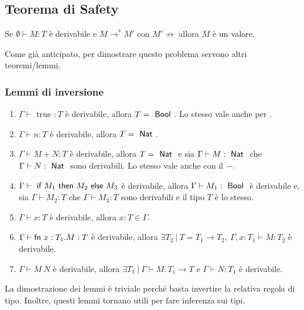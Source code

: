 


\subsection{Teorema di Safety}

\begin{center}
	Se $\emptyset \vdash M : T$ è derivabile e $M \rightarrow^* M'$ con $M' \not\rightarrow$ allora $M$ è un valore.
\end{center}

Come già anticipato, per dimostrare questo problema servono altri teoremi/lemmi.

\subsubsection{Lemmi di inversione}

\begin{enumerate}
	\item $\Gamma \vdash \text{ true } : T $ è derivabile, allora $T = \Bool $. Lo stesso vale anche per .
	\item $\Gamma \vdash n : T$ è derivabile, allora $T = \Nat$.
	\item $\Gamma \vdash M + N : T$ è derivabile, allora $T = \Nat$ e sia $\Gamma \vdash M : \Nat$ che $\Gamma \vdash N : \Nat$ sono derivabili. Lo stesso vale anche con il $-$.
	\item $\Gamma \vdash \iif M_1 \then M_2 \eelse M_3$ è derivabile, allora $\Gamma \vdash M_1 : \Bool$ è derivabile e, sia $\Gamma \vdash M_2 : T $ che $\Gamma \vdash M_3 :T $ sono derivabili e il tipo $T$ è lo stesso.
	\item $\Gamma \vdash x : T$ è derivabile, allora $x : T \in \Gamma$.
	\item $\Gamma \vdash \fn x : T_1 . M : T$ è derivabile, allora $\exists T_2 \: | \: T = T_1 \rightarrow T_2, \: \Gamma, x:T_1 \vdash M : T_2$ è derivabile.
	\item $\Gamma \vdash M \: N$ è derivabile, allora $ \exists T_1 \: | \: \Gamma \vdash M : T_1 \rightarrow T $ e $\Gamma \vdash N : T_1 $ è derivabile.
\end{enumerate}

\noindent La dimostrazione dei lemmi è triviale perché basta invertire la relativa regola di tipo. Inoltre, questi lemmi tornano utili per fare inferenza sui tipi.

